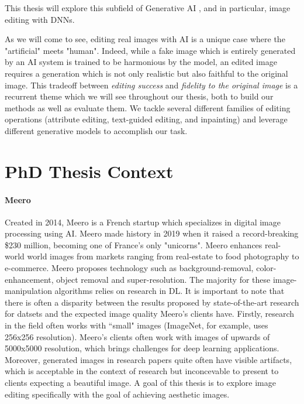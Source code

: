 This thesis will explore this subfield of Generative AI , and in particular, image editing with \ac{DNN}s.


As we will come to see, editing real images with AI is a unique case where the "artificial" meets "human". 
Indeed, while a fake image 
which is entirely generated by an AI system is trained to be harmonious by the model, an edited image
requires a generation which is not only realistic but also faithful to the original image. This 
tradeoff between \emph{editing success} and \emph{fidelity to the original image} is a recurrent theme which we will see throughout 
our thesis, both to build our methods as well as evaluate them. We tackle several different families of editing operations (attribute editing, 
text-guided editing, and inpainting) and leverage different generative models to accomplish our task. 


\section{PhD Thesis Context}

\paragraph{Meero}
Created in 2014, Meero is a French startup which specializes in digital image processing using \ac{AI}. Meero made history in 2019 when 
it raised a record-breaking \$230 million, becoming one of France's only "unicorns". Meero enhances real-world world images from markets
ranging from real-estate to food photography to e-commerce. Meero proposes technology such as background-removal, color-enhancement, object 
removal and super-resolution. The majority for these image-manipulation algorithms relies on research in \ac{DL}.
It is important to note that there is often a disparity between the results proposed by state-of-the-art research for 
datsets and the expected image quality Meero's clients have. Firstly, research in the field often works with ``small" images 
(ImageNet, for example, uses 256x256 resolution). Meero's clients often work with images of upwards of 5000x5000 resolution, 
which brings challenges for deep learning applications.  Moreover, generated images in research papers quite often have 
visible artifacts, which is acceptable in the context of research but inconcevable to present to clients expecting a beautiful 
image. A goal of this thesis is to explore image editing specifically with the goal of achieving aesthetic images.

